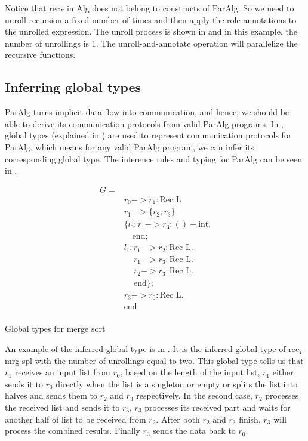 Notice that $\text{rec}_F$ in Alg does not belong to constructs of ParAlg. So we need to unroll recursion a fixed number of times and then apply the role annotations to the unrolled expression. The unroll process is shown in  and in this example, the number of unrollings is 1. The unroll-and-annotate operation will parallelize the recursive functions.
\subsection{Inferring global types}
ParAlg turns implicit data-flow into communication, and hence, we should be able to derive its communication protocols from valid ParAlg programs. In \cite{AlgebraicMultipartyProtocol}, global types (explained in ) are used to represent communication protocols for ParAlg, which means for any valid ParAlg program, we can infer its corresponding global type. The inference rules and typing for ParAlg can be seen in \cite{AlgebraicMultipartyProtocol}. 
\begin{listing}[ht]
    \begin{align*}
       G = \\ 
       & r_0 -> r_1: \text{Rec L} \\
       & r_1 -> \{r_2, r_3\}\\
       & \{ l_0 : r_1 -> r_3 : () + \text{int}.\\
       & \quad \text{end};\\
       &  l_1 :  r_1 -> r_2 : \text{Rec L}.\\
       &  \,\quad  r_1 -> r_3 : \text{Rec L}.\\
       &  \,\quad  r_2 -> r_3 : \text{Rec L}.\\
       &  \,\quad  \text{end} \}; \\
       & r_3 -> r_0 : \text{Rec L}.\\
       & \text{end}\\
    \end{align*}
    \caption{Global types for merge sort}
    \label{project:code:ms2}
\end{listing}

An example of the inferred global type is in . It is the inferred global type of $\text{rec}_T$ mrg spl with the number of unrollings equal to two. This global type tells us that $r_1$ receives an input list from $r_0$, based on the length of the input list, $r_1$ either sends it to $r_3$ directly when the list is a singleton or empty or splits the list into halves and sends them to $r_2$ and $r_3$ respectively. In the second case, $r_2$ processes the received list and sends it to $r_3$, $r_3$ processes its received part and waits for another half of list to be received from $r_2$. After both $r_2$ and $r_3$ finish, $r_3$ will process the combined results. Finally $r_3$ sends the data back to $r_0$.

